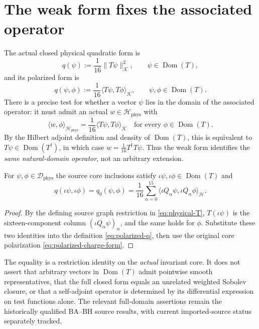\section{The weak form fixes the associated operator}
The actual closed physical quadratic form is
\begin{equation}\label{eq:closed-q}
 q(\psi):=\frac1{16}\|T\psi\|_{\mathscr K}^2,
 \qquad \psi\in\operatorname{Dom}(T),
\end{equation}
and its polarized form is
\begin{equation}\label{eq:polarized-q}
 q(\psi,\phi):=\frac1{16}
 \langle T\psi,T\phi\rangle_{\mathscr K},\qquad
 \psi,\phi\in\operatorname{Dom}(T).
\end{equation}
There is a precise test for whether a vector $\psi$ lies in the
domain of the associated operator: it must admit an actual
$w\in\mathscr H_{\mathrm{phys}}$ with
\begin{equation}\label{eq:weak-form-criterion}
 \langle w,\phi\rangle_{\mathscr H_{\mathrm{phys}}}
 =\frac1{16}\langle T\psi,T\phi\rangle_{\mathscr K}
 \quad\text{for every }\phi\in\operatorname{Dom}(T).
\end{equation}
By the Hilbert adjoint definition and density of $\operatorname{Dom}(T)$,
this is equivalent to $T\psi\in\operatorname{Dom}(T^\dagger)$, in which
case $w=\frac1{16}T^\dagger T\psi$. Thus the weak form identifies the
\emph{same natural-domain operator}, not an arbitrary extension.

\begin{proposition}
For $\psi,\phi\in\mathscr D_{\mathrm{phys}}$ the source core
inclusions satisfy $\iota\psi,\iota\phi\in\operatorname{Dom}(T)$ and
\begin{equation}\label{eq:physical-core-form-agreement}
 q(\iota\psi,\iota\phi)
 =q_0(\psi,\phi)
 =\frac1{16}\sum_{\alpha=0}^{15}
  \langle\iota Q_\alpha\psi,\iota Q_\alpha\phi\rangle_{\mathscr H}.
\end{equation}
\end{proposition}
\begin{proof}
By the defining source graph restriction in
\eqref{eq:physical-T}, $T(\iota\psi)$ is the sixteen-component
column $(\iota Q_\alpha\psi)_\alpha$, and the same holds for
$\phi$. Substitute these two identities into the definition
\eqref{eq:polarized-q}, then use the original core polarization
\eqref{eq:polarized-charge-form}.
\end{proof}
The equality is a restriction identity on the \emph{actual}
invariant core. It does not assert that arbitrary vectors in
$\operatorname{Dom}(T)$ admit pointwise smooth representatives,
that the full closed form equals an unrelated weighted Sobolev
closure, or that a self-adjoint operator is determined by its
differential expression on test functions alone. The relevant
full-domain assertions remain the historically qualified BA--BH
source results, with current imported-source status separately tracked.

